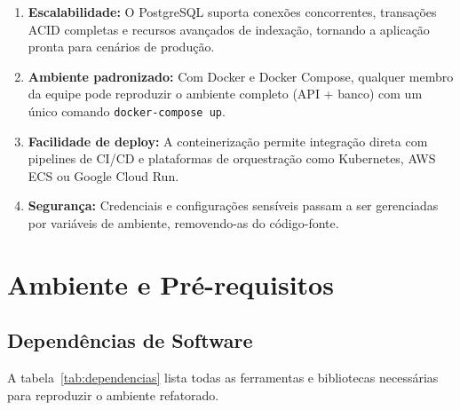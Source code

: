\documentclass[12pt,a4paper]{article}
\begin{document}
\begin{enumerate}[nosep]
  \item \textbf{Escalabilidade:} O PostgreSQL suporta conexões concorrentes,
        transações ACID completas e recursos avançados de indexação, tornando a
        aplicação pronta para cenários de produção.
  \item \textbf{Ambiente padronizado:} Com Docker e Docker Compose, qualquer membro
        da equipe pode reproduzir o ambiente completo (API + banco) com um único
        comando \texttt{docker-compose up}.
  \item \textbf{Facilidade de deploy:} A conteinerização permite integração direta
        com pipelines de CI/CD e plataformas de orquestração como Kubernetes, AWS ECS
        ou Google Cloud Run.
  \item \textbf{Segurança:} Credenciais e configurações sensíveis passam a ser
        gerenciadas por variáveis de ambiente, removendo-as do código-fonte.
\end{enumerate}

\section{Ambiente e Pré-requisitos}
\label{sec:prerequisitos}

\subsection{Dependências de Software}

A tabela~\ref{tab:dependencias} lista todas as ferramentas e bibliotecas necessárias
para reproduzir o ambiente refatorado.
\end{document}
